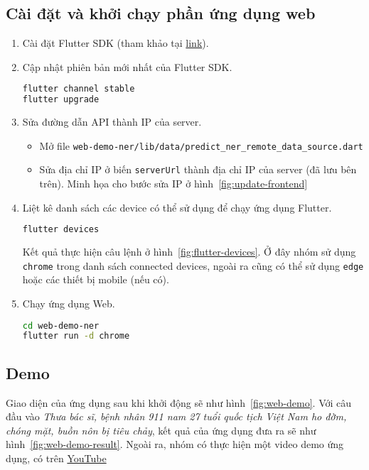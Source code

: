 \subsection{Cài đặt và khởi chạy phần ứng dụng web}
\begin{enumerate}
\item Cài đặt Flutter SDK (tham khảo tại \href{https://docs.flutter.dev/get-started/install}{link}).

\item Cập nhật phiên bản mới nhất của Flutter SDK.
\lstset{style=mystyle}
\begin{lstlisting}[language=bash]
flutter channel stable
flutter upgrade
\end{lstlisting}

\item Sửa đường dẫn API thành IP của server.
\begin{itemize}
\item Mở file \texttt{web-demo-ner/lib/data/predict\_ner\_remote\_data\_source.dart}
\item Sửa địa chỉ IP ở biến \texttt{serverUrl} thành địa chỉ IP của server (đã lưu bên trên). Minh họa cho bước sửa IP ở hình~\ref{fig:update-frontend}
\end{itemize}

\item Liệt kê danh sách các device có thể sử dụng để chạy ứng dụng Flutter.
\begin{lstlisting}[language=bash]
flutter devices
\end{lstlisting}
Kết quả thực hiện câu lệnh ở hình~\ref{fig:flutter-devices}. Ở đây nhóm sử dụng \texttt{chrome} trong danh sách connected devices, ngoài ra cũng có thể sử dụng \texttt{edge} hoặc các thiết bị mobile (nếu có).

\item Chạy ứng dụng Web.
\begin{lstlisting}[language=bash]
cd web-demo-ner
flutter run -d chrome
\end{lstlisting}
\end{enumerate}

\subsection{Demo}
Giao diện của ứng dụng sau khi khởi động sẽ như hình~\ref{fig:web-demo}. Với câu đầu vào \textit{Thưa bác sĩ, bệnh nhân 911 nam 27 tuổi quốc tịch Việt Nam ho đờm, chóng mặt, buồn nôn
bị tiêu chảy}, kết quả của ứng dụng đưa ra sẽ như hình~\ref{fig:web-demo-result}. Ngoài ra, nhóm có thực hiện một video demo ứng dụng, có trên \href{https://youtu.be/wpURv_DAAa4}{YouTube}